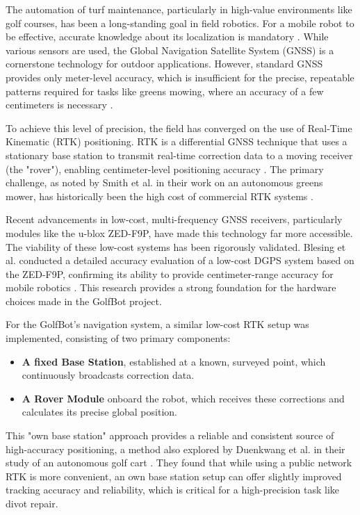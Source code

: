 The automation of turf maintenance, particularly in high-value environments like golf courses, has been a long-standing goal in field robotics. For a mobile robot to be effective, accurate knowledge about its localization is mandatory \cite{ferreira2020realtime}. While various sensors are used, the Global Navigation Satellite System (GNSS) is a cornerstone technology for outdoor applications. However, standard GNSS provides only meter-level accuracy, which is insufficient for the precise, repeatable patterns required for tasks like greens mowing, where an accuracy of a few centimeters is necessary \cite{smith2012outdoor}.

To achieve this level of precision, the field has converged on the use of Real-Time Kinematic (RTK) positioning. RTK is a differential GNSS technique that uses a stationary base station to transmit real-time correction data to a moving receiver (the "rover"), enabling centimeter-level positioning accuracy \cite{ferreira2020realtime, blesing2023accuracy}. The primary challenge, as noted by Smith et al. in their work on an autonomous greens mower, has historically been the high cost of commercial RTK systems \cite{smith2012outdoor}.

Recent advancements in low-cost, multi-frequency GNSS receivers, particularly modules like the u-blox ZED-F9P, have made this technology far more accessible. The viability of these low-cost systems has been rigorously validated. Blesing et al. conducted a detailed accuracy evaluation of a low-cost DGPS system based on the ZED-F9P, confirming its ability to provide centimeter-range accuracy for mobile robotics \cite{blesing2023accuracy}. This research provides a strong foundation for the hardware choices made in the GolfBot project.

For the GolfBot's navigation system, a similar low-cost RTK setup was implemented, consisting of two primary components:
\begin{itemize}
    \item \textbf{A fixed Base Station}, established at a known, surveyed point, which continuously broadcasts correction data.
    \item \textbf{A Rover Module} onboard the robot, which receives these corrections and calculates its precise global position.
\end{itemize}
This "own base station" approach provides a reliable and consistent source of high-accuracy positioning, a method also explored by Duenkwang et al. in their study of an autonomous golf cart \cite{duenkwang2023comparing}. They found that while using a public network RTK is more convenient, an own base station setup can offer slightly improved tracking accuracy and reliability, which is critical for a high-precision task like divot repair.

